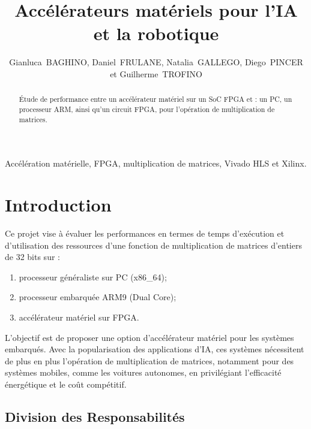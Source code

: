 \documentclass[journal]{IEEEtran}
\begin{document}
\title{Accélérateurs matériels pour l'IA et la robotique}

\author{Gianluca~BAGHINO,
        Daniel~FRULANE,
        Natalia~GALLEGO,
        Diego~PINCER
        et Guilherme~TROFINO%
}


\maketitle

\begin{abstract}
Étude de performance entre un accélérateur matériel sur un SoC FPGA et : un PC, un processeur ARM, ainsi qu'un circuit FPGA, pour l'opération de multiplication de matrices.
\end{abstract}

\begin{IEEEkeywords}
Accélération matérielle, FPGA, multiplication de matrices, Vivado HLS et Xilinx.
\end{IEEEkeywords}

\IEEEpeerreviewmaketitle

\section{Introduction}

Ce projet vise à évaluer les performances en termes de temps d'exécution et d'utilisation des ressources d'une fonction de multiplication de matrices d'entiers de 32 bits sur :
\begin{enumerate}
    \item processeur généraliste sur PC (x86\_64);
    \item processeur embarquée ARM9 (Dual Core);
    \item accélérateur matériel sur FPGA.
\end{enumerate}

L'objectif est de proposer une option d'accélérateur matériel pour les systèmes embarqués. Avec la popularisation des applications d'IA, ces systèmes nécessitent de plus en plus l'opération de multiplication de matrices, notamment pour des systèmes mobiles, comme les voitures autonomes, en privilégiant l'efficacité énergétique et le coût compétitif.

\subsection{Division des Responsabilités}
\end{document}
